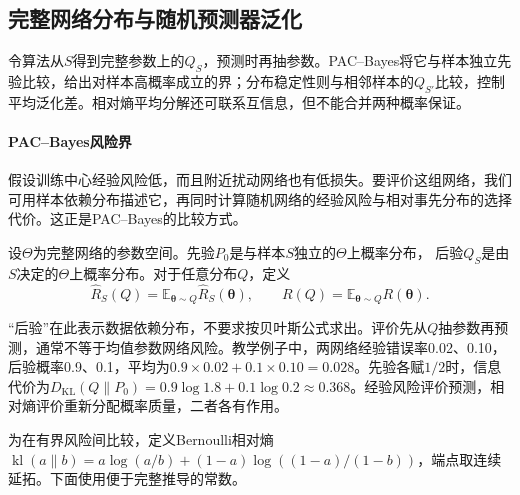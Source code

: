 \subsection{完整网络分布与随机预测器泛化}
\label{sec:pac-bayes}

令算法从$S$得到完整参数上的$Q_S$，预测时再抽参数。PAC--Bayes将它与样本独立先验比较，给出对样本高概率成立的界；分布稳定性则与相邻样本的$Q_{S'}$比较，控制平均泛化差。相对熵平均分解还可联系互信息，但不能合并两种概率保证。

\paragraph{PAC--Bayes风险界}

假设训练中心经验风险低，而且附近扰动网络也有低损失。要评价这组网络，我们可用样本依赖分布描述它，再同时计算随机网络的经验风险与相对事先分布的选择代价。这正是PAC--Bayes的比较方式。

\begin{definition}
\label{def:pac-bayes-distributions}
设$\Theta$为完整网络的参数空间。先验$P_0$是与样本$S$独立的$\Theta$上概率分布，
后验$Q_S$是由$S$决定的$\Theta$上概率分布。对于任意分布$Q$，定义
\[
 \hat R_S(Q)=\mathbb E_{\bm\theta\sim Q}\hat R_S(\bm\theta),
 \qquad R(Q)=\mathbb E_{\bm\theta\sim Q}R(\bm\theta).
\]
\end{definition}

“后验”在此表示数据依赖分布，不要求按贝叶斯公式求出。评价先从$Q$抽参数再预测，通常不等于均值参数网络风险。教学例子中，两网络经验错误率0.02、0.10，后验概率0.9、0.1，平均为$0.9\times0.02+0.1\times0.10=0.028$。先验各赋$1/2$时，信息代价为$D_{\mathrm{KL}}(Q\|P_0)=0.9\log1.8+0.1\log0.2\approx0.368$。经验风险评价预测，相对熵评价重新分配概率质量，二者各有作用。

为在有界风险间比较，定义Bernoulli相对熵$\operatorname{kl}(a\|b)=a\log(a/b)+(1-a)\log((1-a)/(1-b))$，端点取连续延拓。下面使用便于完整推导的常数。

